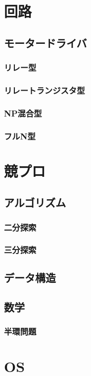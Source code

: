 \documentclass{jarticle}
\begin{document}
\section{回路}
   \subsection{モータードライバ}
      \subsubsection{リレー型}
      \subsubsection{リレートランジスタ型}
      \subsubsection{NP混合型}
      \subsubsection{フルN型}
\clearpage
\section{競プロ}
   \subsection{アルゴリズム}
      \subsubsection{二分探索}
      \subsubsection{三分探索}
   \subsection{データ構造}
   \subsection{数学}
      \subsubsection{半環問題}
\clearpage
\section{OS}
\clearpage
\end{document}
